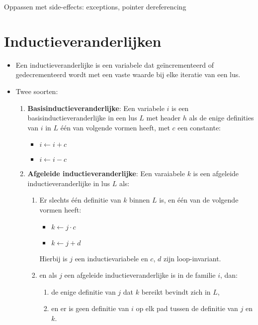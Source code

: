 Oppassen met side-effects: exceptions, pointer dereferencing

\section{Inductieveranderlijken}
\begin{itemize}
	\item Een inductieveranderlijke is een variabele dat geïncrementeerd of gedecrementeerd wordt met een vaste waarde bij elke iteratie van een lus.
	\item Twee soorten:
	\begin{enumerate}
		\item \textbf{Basisinductieveranderlijke}: Een variabele $i$ is een basisinductieveranderlijke in een lus $L$ met header $h$ als de enige definities van $i$ in $L$ één van volgende vormen heeft, met $c$ een constante:
		\begin{itemize}
			\item $i \leftarrow i + c$
			\item $i \leftarrow i - c$
		\end{itemize} 
		\item \textbf{Afgeleide inductieveranderlijke}: Een varaiabele $k$ is een afgeleide inductieveranderlijke in lus $L$ als:
		\begin{enumerate}
			\item Er slechts één definitie van $k$ binnen $L$ is, en één van de volgende vormen heeft:
			\begin{itemize}
				\item $k \leftarrow j \cdot c$
				\item $k \leftarrow j + d$
			\end{itemize}
			Hierbij is $j$ een inductievariabele en $c$, $d$ zijn loop-invariant.
			\item en als $j$ een afgeleide inductieveranderlijke is in de familie $i$, dan:
			\begin{enumerate}
				\item de enige definitie van $j$ dat $k$ bereikt bevindt zich in $L$,
				\item en er is geen definitie van $i$ op elk pad tussen de definitie van $j$ en $k$.
			\end{enumerate}
		\end{enumerate}
	\end{enumerate}
\end{itemize}



